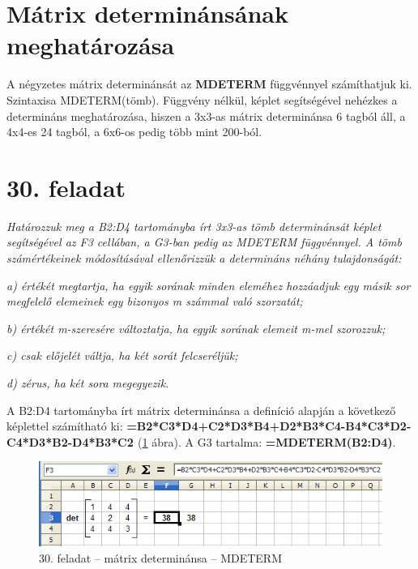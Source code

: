 \section[Mátrix determinánsának meghatározása]{Mátrix
determinánsának meghatározása}

A négyzetes mátrix determinánsát az \textbf{MDETERM}
függvénnyel számíthatjuk ki. Szintaxisa MDETERM(tömb).
Függvény nélkül, képlet segítségével nehézkes a
determináns meghatározása, hiszen a 3x3-as mátrix
determinánsa 6 tagból áll, a 4x4-es 24 tagból, a 6x6-os pedig
több mint 200-ból. 

\section{30. feladat}

{\itshape
Határozzuk meg a B2:D4 tartományba írt 3x3-as tömb
determinánsát képlet segítségével az F3 cellában, a
G3-ban pedig az MDETERM függvénnyel. A tömb számértékeinek
módosításával ellenőrizzük a determináns néhány
tulajdonságát:}

{\itshape
a) értékét megtartja, ha egyik sorának minden eleméhez
hozzáadjuk egy másik sor megfelelő elemeinek egy bizonyos m
számmal való szorzatát;}

{\itshape
b) értékét m-szeresére változtatja, ha egyik sorának elemeit
m-mel szorozzuk;}

{\itshape
c) csak előjelét váltja, ha két sorát felcseréljük;}

{\itshape
d) zérus, ha két sora megegyezik.}

A B2:D4 tartományba írt mátrix determinánsa a definíció
alapján a következő képlettel számítható ki:
{\sffamily\bfseries{=B2*C3*D4+C2*D3*B4+D2*B3*C4-B4*C3*D2-C4*D3*B2-D4*B3*C2 }}
(\ref{30-feladatMátrixMDETERM} ábra).
A G3 tartalma: {\sffamily\bfseries{=MDETERM(B2:D4)}}.

\begin{figure}[!h]
\begin{center}
\includegraphics[width=12.974cm]{oocalcv1-img135.png}
\caption{30. feladat --  mátrix determinánsa --  MDETERM}\label{30-feladatMátrixMDETERM}
\end{center}
\end{figure}


